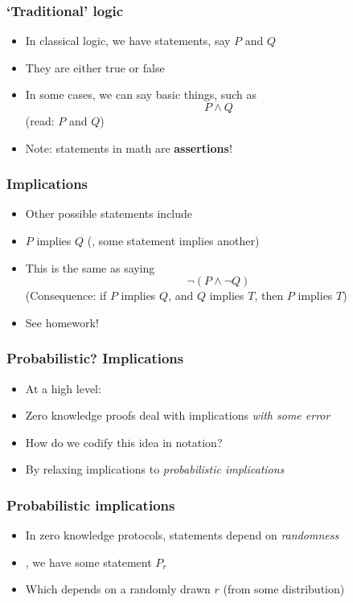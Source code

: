 \documentclass{beamer}
\begin{document}
    \begin{frame}
        \frametitle{`Traditional' logic}
        \begin{itemize}\itemsep=12pt
            \item In classical logic, we have statements, say $P$ and $Q$
            \pause
            \item They are either true or false
            \pause
            \item In some cases, we can say basic
                things, such as
            \[
                P \wedge Q
            \]
            (read: $P$ and $Q$)

            \item Note: statements in math are {\bf assertions}!
        \end{itemize}
    \end{frame}

    \begin{frame}
        \frametitle{Implications}
        \begin{itemize}\itemsep=12pt
            \item Other possible statements include
            \item $P$ implies $Q$ (\ie, some statement implies another)
            \pause
            \item This is the same as saying
            \[
                \neg (P \wedge \neg Q)
            \]
            (Consequence: if $P$ implies $Q$, and $Q$ implies $T$, then $P$ implies $T$)
            \item See homework!
        \end{itemize}
    \end{frame}

    \begin{frame}
        \frametitle{Probabilistic? Implications}
        \begin{itemize}\itemsep=12pt
            \item At a high level:
            \item Zero knowledge proofs deal with implications \emph{with some error}
            \pause
            \item How do we codify this idea in notation?
            \pause
            \item By relaxing implications to \emph{probabilistic implications}
        \end{itemize}
    \end{frame}

    \begin{frame}
        \frametitle{Probabilistic implications}
        \begin{itemize}\itemsep=12pt
            \item In zero knowledge protocols, statements depend on \emph{randomness}
            \item \ie, we have some statement $P_r$
            \item Which depends on a randomly drawn $r$ (from some distribution)
        \end{itemize}
    \end{frame}
\end{document}
